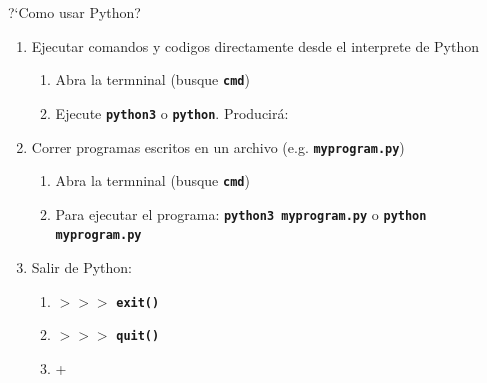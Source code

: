 \documentclass[
10pt,
aspectratio=169,
]{beamer}
\newcommand{\co}[1]{\alert{\textbf{\texttt{#1}}}}
\begin{document}
\begin{frame}[c]{?`Como usar Python?}
\begin{enumerate}
\item Ejecutar comandos y codigos directamente desde el interprete de Python

\begin{enumerate}
\item Abra la termninal (busque \co{cmd})
\item Ejecute \co{python3} o \co{python}. Producir\'a:
\end{enumerate}
\item Correr programas escritos en un archivo (e.g. \co{myprogram.py})
\begin{enumerate}
\item Abra la termninal (busque \co{cmd})
\item Para ejecutar el programa: \co{python3 myprogram.py} o \co{python myprogram.py}
\end{enumerate}
\item Salir de Python:
\begin{enumerate}
\item $> > >$ \co{exit()}
\item $> > >$ \co{quit()}
\item {} + 
\end{enumerate}

\end{enumerate}

\end{frame}
\end{document}
